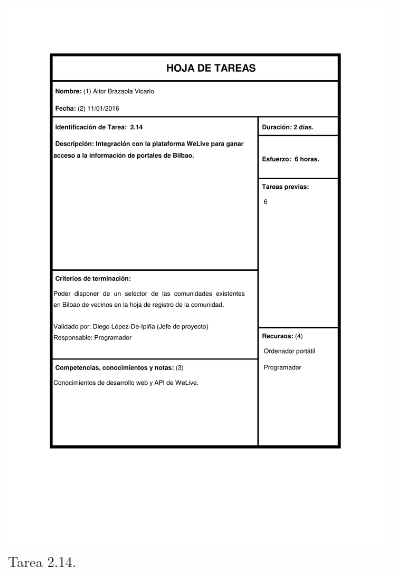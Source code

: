 \documentclass{DeustoFDP}
\begin{document}
\begin{figure}[H]
	\centering
	\includegraphics[width=0.9\textwidth]{fig/Tareas/214}
	\caption{Tarea 2.14.}
	\label{fig:t214}
\end{figure}
\end{document}
